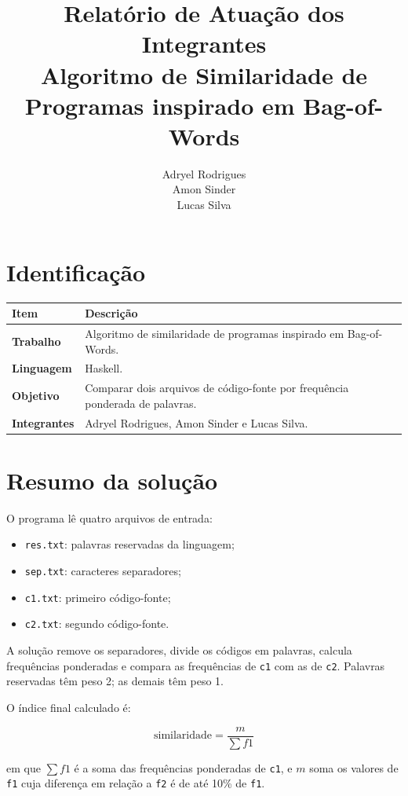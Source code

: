 \documentclass[12pt,a4paper]{article}
\title{
    Relatório de Atuação dos Integrantes\\
    \large Algoritmo de Similaridade de Programas inspirado em Bag-of-Words
}
\author{
    Adryel Rodrigues\\
    Amon Sinder\\
    Lucas Silva
}
\date{}
\newcommand{\arquivo}[1]{\texttt{#1}}
\begin{document}
\maketitle

\section{Identificação}

\begin{tabularx}{\textwidth}{>{\bfseries}p{4cm}X}
\toprule
Item & Descrição \\
\midrule
Trabalho & Algoritmo de similaridade de programas inspirado em Bag-of-Words. \\
Linguagem & Haskell. \\
Objetivo & Comparar dois arquivos de código-fonte por frequência ponderada de palavras. \\
Integrantes & Adryel Rodrigues, Amon Sinder e Lucas Silva. \\
\bottomrule
\end{tabularx}

\section{Resumo da solução}

O programa lê quatro arquivos de entrada:

\begin{itemize}[leftmargin=1.2cm]
    \item \arquivo{res.txt}: palavras reservadas da linguagem;
    \item \arquivo{sep.txt}: caracteres separadores;
    \item \arquivo{c1.txt}: primeiro código-fonte;
    \item \arquivo{c2.txt}: segundo código-fonte.
\end{itemize}

A solução remove os separadores, divide os códigos em palavras, calcula frequências ponderadas e compara as frequências de \arquivo{c1} com as de \arquivo{c2}. Palavras reservadas têm peso 2; as demais têm peso 1.

O índice final calculado é:

\[
\text{similaridade} = \frac{m}{\sum f1}
\]

em que \(\sum f1\) é a soma das frequências ponderadas de \arquivo{c1}, e \(m\) soma os valores de \arquivo{f1} cuja diferença em relação a \arquivo{f2} é de até 10\% de \arquivo{f1}.
\end{document}
